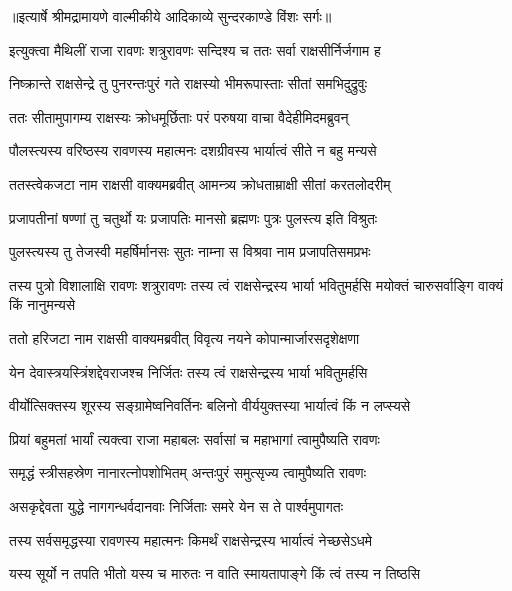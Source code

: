 {॥इत्यार्षे श्रीमद्रामायणे वाल्मीकीये आदिकाव्ये सुन्दरकाण्डे विंशः सर्गः॥}


\twolineshloka
{इत्युक्त्वा मैथिलीं राजा रावणः शत्रुरावणः}
{सन्दिश्य च ततः सर्वा राक्षसीर्निर्जगाम ह} %

\twolineshloka
{निष्क्रान्ते राक्षसेन्द्रे तु पुनरन्तःपुरं गते}
{राक्षस्यो भीमरूपास्ताः सीतां समभिदुद्रुवुः} %

\twolineshloka
{ततः सीतामुपागम्य राक्षस्यः क्रोधमूर्छिताः}
{परं परुषया वाचा वैदेहीमिदमब्रुवन्} %

\twolineshloka
{पौलस्त्यस्य वरिष्ठस्य रावणस्य महात्मनः}
{दशग्रीवस्य भार्यात्वं सीते न बहु मन्यसे} %

\twolineshloka
{ततस्त्वेकजटा नाम राक्षसी वाक्यमब्रवीत्}
{आमन्त्र्य क्रोधताम्राक्षी सीतां करतलोदरीम्} %

\twolineshloka
{प्रजापतीनां षण्णां तु चतुर्थो यः प्रजापतिः}
{मानसो ब्रह्मणः पुत्रः पुलस्त्य इति विश्रुतः} %

\twolineshloka
{पुलस्त्यस्य तु तेजस्वी महर्षिर्मानसः सुतः}
{नाम्ना स विश्रवा नाम प्रजापतिसमप्रभः} %

\threelineshloka
{तस्य पुत्रो विशालाक्षि रावणः शत्रुरावणः}
{तस्य त्वं राक्षसेन्द्रस्य भार्या भवितुमर्हसि}
{मयोक्तं चारुसर्वाङ्गि वाक्यं किं नानुमन्यसे} %

\twolineshloka
{ततो हरिजटा नाम राक्षसी वाक्यमब्रवीत्}
{विवृत्य नयने कोपान्मार्जारसदृशेक्षणा} %

\twolineshloka
{येन देवास्त्रयस्त्रिंशद्देवराजश्च निर्जितः}
{तस्य त्वं राक्षसेन्द्रस्य भार्या भवितुमर्हसि} %

\twolineshloka
{वीर्योत्सिक्तस्य शूरस्य सङ्ग्रामेष्वनिवर्तिनः}
{बलिनो वीर्ययुक्तस्या भार्यात्वं किं न लप्स्यसे} %

\twolineshloka
{प्रियां बहुमतां भार्यां त्यक्त्वा राजा महाबलः}
{सर्वासां च महाभागां त्वामुपैष्यति रावणः} %

\twolineshloka
{समृद्धं स्त्रीसहस्रेण नानारत्नोपशोभितम्}
{अन्तःपुरं समुत्सृज्य त्वामुपैष्यति रावणः} %

\twolineshloka
{असकृद्देवता युद्धे नागगन्धर्वदानवाः}
{निर्जिताः समरे येन स ते पार्श्वमुपागतः} %

\twolineshloka
{तस्य सर्वसमृद्धस्या रावणस्य महात्मनः}
{किमर्थं राक्षसेन्द्रस्य भार्यात्वं नेच्छसेऽधमे} %

\twolineshloka
{यस्य सूर्यो न तपति भीतो यस्य च मारुतः}
{न वाति स्मायतापाङ्गे किं त्वं तस्य न तिष्ठसि} %

